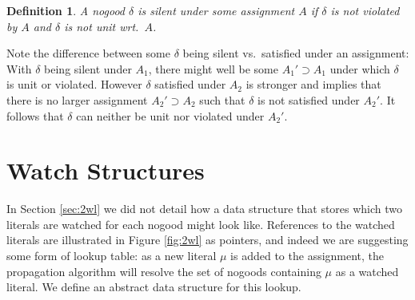 \documentclass{vutinfth} %
\newtheorem{definition}{Definition}[chapter]
\newcommand{\ass}{A}
\newcommand{\sgl}{\mu}
\begin{document}
\begin{definition}
A nogood $\delta$ is \emph{silent} under some assignment $\ass$ if $\delta$ is not violated by $\ass$ and $\delta$ is not unit wrt.~$\ass$.
\end{definition}

Note the difference between some $\delta$ being silent vs.~satisfied under an assignment: With $\delta$ being silent under $\ass_1$, there might well be some $\ass_1' \supset \ass_1$ under which $\delta$ is unit or violated. However $\delta$ satisfied under $\ass_2$ is stronger and implies that there is no larger assignment $\ass_2' \supset \ass_2$ such that $\delta$ is not satisfied under $\ass_2'$. It follows that $\delta$ can neither be unit nor violated under $\ass_2'$.

\section{Watch Structures}

In Section \ref{sec:2wl} we did not detail how a data structure that stores which two literals are watched for each nogood might look like. References to the watched literals are illustrated in Figure \ref{fig:2wl} as pointers, and indeed we are suggesting some form of lookup table: as a new literal $\sgl$ is added to the assignment, the propagation algorithm will resolve the set of nogoods containing $\sgl$ as a watched literal. We define an abstract data structure for this lookup.





\end{document}
